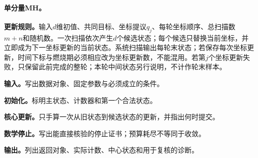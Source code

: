 \paragraph{单分量MH。}
\textbf{更新规则。}输入$d$维初值、共同目标、坐标提议$q_j$、每轮坐标顺序、总扫描数$m+n$和随机数。一次扫描依次产生$d$个候选状态；每个候选只替换当前坐标，并立即成为下一坐标更新的当前状态。系统扫描输出每轮末状态；若保存每次坐标更新，时间下标与燃烧期必须相应改为坐标更新数，不能混用。若第$j$个坐标更新失败，只保留此前完成的整轮；本轮中间状态另行说明，不计作轮末样本。

\begingroup
{}

\begin{keypointbox}[title={固定顺序的单分量MH扫描：五步阅读}]
\textbf{输入。}写出数据对象、固定参数与必须成立的条件。\par
\textbf{初始化。}标明主状态、计数器和第一个合法状态。\par
\textbf{核心更新。}只手算一次从旧状态到候选状态的更新，并指出何时提交。\par
\textbf{数学停止。}写出能直接核验的停止证书；预算耗尽不等同于收敛。\par
\textbf{输出。}列出返回对象、实际计数、中心状态和用于复核的诊断。
\end{keypointbox}


